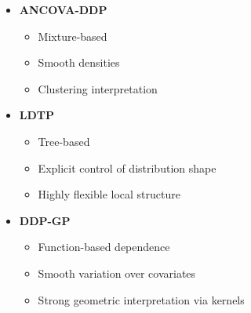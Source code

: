 \documentclass[12pt,oneside]{book}
\numberwithin{equation}{section}
\theoremstyle{definition}
\theoremstyle{plain}
\theoremstyle{remark}
\begin{document}
\begin{itemize}
\item \textbf{ANCOVA-DDP}
\begin{itemize}
\item Mixture-based
\item Smooth densities
\item Clustering interpretation
\end{itemize}

\item \textbf{LDTP}
\begin{itemize}
\item Tree-based
\item Explicit control of distribution shape
\item Highly flexible local structure
\end{itemize}

\item \textbf{DDP-GP}
\begin{itemize}
\item Function-based dependence
\item Smooth variation over covariates
\item Strong geometric interpretation via kernels
\end{itemize}
\end{itemize}
\end{document}
